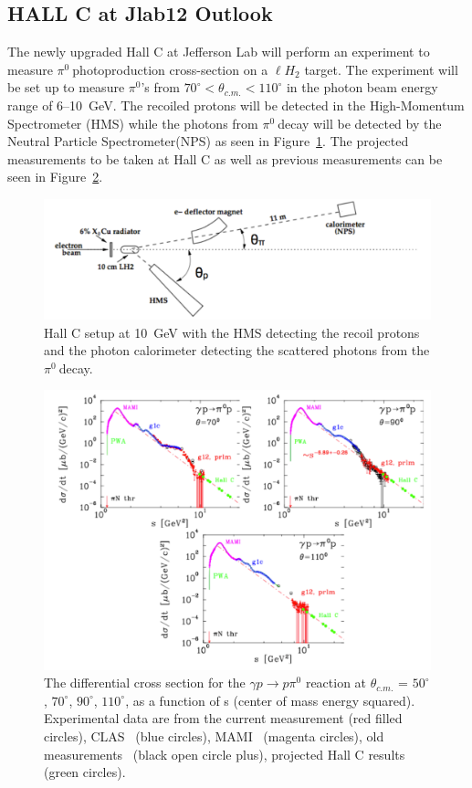 \documentclass{aip-cp}
\def\piz{$\pi^{0}\ $}
\begin{document}
\subsection{HALL C at Jlab12 Outlook}
The newly upgraded Hall C at Jefferson Lab will perform an experiment to measure \piz photoproduction cross-section on a $\ell H_2$ target. The experiment will be set up to measure $\pi^{0}$'s from $70^{\circ}<\theta_{c.m.}<110^{\circ}$ in the photon beam energy range of 6--10~GeV. The recoiled protons will be detected in the High-Momentum Spectrometer (HMS) while the photons from \piz decay will be detected by the Neutral Particle Spectrometer(NPS) as seen in Figure~\ref{fig:hallc12}.
The projected measurements to be taken at Hall C as well as previous measurements can be seen in Figure~\ref{fig:pi0_projected}.
\begin{figure}[h]
	\centerline{\includegraphics[width=250 pt, height = 100 pt]{figures/HALLC12.pdf}}
	\caption{Hall C setup at 10~GeV with the HMS detecting the recoil protons and the photon calorimeter detecting the scattered photons from the \piz decay. }
	\label{fig:hallc12}
\end{figure}
\begin{figure}[h]
	\centerline{\includegraphics[width=300 pt, height = 160 pt]{figures/HallC_projected.pdf}}
	\caption{The differential cross section for the $\gamma p \to p \pi^0$ reaction at $\theta_{c.m.}$ = $50^{\circ}$, $70^{\circ}$, $90^{\circ}$, $110^{\circ}$, as a function of s (center of mass energy squared). Experimental data are from the current measurement (red filled circles), CLAS~\protect\cite{Dugger07,Dugger13} (blue circles), MAMI~\protect\cite{beck} (magenta circles), old measurements~\protect\cite{Joos,Fuchs} (black open circle plus), projected Hall C results (green circles). }
	\label{fig:pi0_projected}
\end{figure}
\newpage

\nocite{*}
%
%
\end{document}
